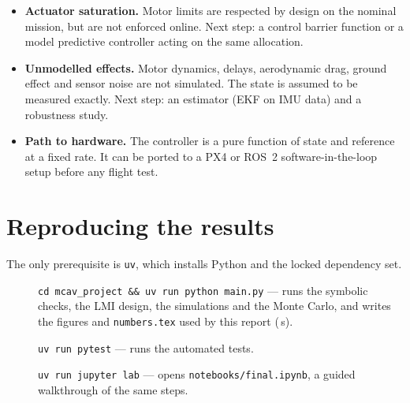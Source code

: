 \documentclass[10pt,a4paper]{scrartcl}
\newcommand{\RuleSection}[1]{%
    \section{#1}%
    \vspace{0.2em}{\color{accent!35}\hrule height 0.4pt}\vspace{0.3em}%
  }
\begin{document}
  \begin{itemize}
    \item \textbf{Actuator saturation.} Motor limits are respected by design on the nominal
      mission, but are not enforced online. Next step: a control barrier function or a model
      predictive controller acting on the same allocation.
    \item \textbf{Unmodelled effects.} Motor dynamics, delays, aerodynamic drag, ground effect
      and sensor noise are not simulated. The state is assumed to be measured exactly. Next
      step: an estimator (EKF on IMU data) and a robustness study.
    \item \textbf{Path to hardware.} The controller is a pure function of state and reference
      at a fixed rate. It can be ported to a PX4 or ROS~2 software-in-the-loop setup before any
      flight test.
  \end{itemize}

  \RuleSection{Reproducing the results}
  \label{sec:run}

  The only prerequisite is \texttt{uv}, which installs Python and the locked dependency set.
  \begin{description}
    \item[] \texttt{cd mcav\_project \&\& uv run python main.py} --- runs the symbolic checks,
      the LMI design, the simulations and the Monte Carlo, and writes the figures and
      \texttt{numbers.tex} used by this report (\RRuntime\,s).
    \item[] \texttt{uv run pytest} --- runs the automated tests.
    \item[] \texttt{uv run jupyter lab} --- opens \texttt{notebooks/final.ipynb}, a guided
      walkthrough of the same steps.
  \end{description}

  
  

  
\end{document}
